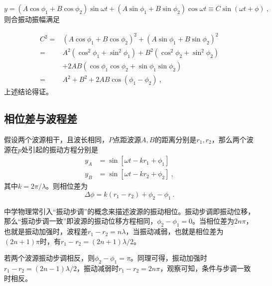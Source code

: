 \begin{equation}
y=\left(A \cos \phi_1+B \cos \phi_2\right) \sin \omega t+\left(A \sin \phi_1+B \sin \phi_2\right) \cos \omega t\equiv C\sin (\omega t+\phi)~,
\end{equation}
则合振动振幅满足

\begin{equation}
\begin{aligned}
C^2
= & \left(A \cos \phi_1+B \cos \phi_2\right)^2+\left(A \sin \phi_1+B \sin \phi_2\right)^2 \\
= & A^2\left(\cos ^2 \phi_1+\sin ^2 \phi_1\right)+B^2\left(\cos ^2 \phi_2+\sin ^2 \phi_2\right) \\
& +2 A B\left(\cos \phi_1 \cos \phi_2+\sin \phi_1 \sin \phi_2\right) \\
= & A^2+B^2+2 A B \cos \left(\phi_1-\phi_2\right)~,
\end{aligned}
\end{equation}
上述结论得证。
\subsection{相位差与波程差}
假设两个波源相干，且波长相同，$P$点距波源$A,B$的距离分别是$r_1,r_2$，那么两个波源在$p$处引起的振动方程分别是
\begin{equation}
\begin{aligned}
y_A&=\sin[\omega t-kr_1+\phi_1]\\
y_B&=\sin[\omega t-kr_2+\phi_2]~,
\end{aligned}
\end{equation}
其中$k=2\pi/\lambda$。则相位差为
\begin{equation}
\Delta\phi=k(r_1-r_2)+\phi_2-\phi_1~.
\end{equation}

中学物理常引入“振动步调”的概念来描述波源的振动相位。振动步调即振动位移，那么“振动步调一致”即波源的振动位移方程相同，$\phi_2-\phi_1=0$。当相位差为$2n\pi$，也就是振动加强时，波程差$r_1-r_2=n\lambda$，当振动减弱，也就是相位差为$(2n+1)\pi$时，有$r_1-r_2=(2n+1)\lambda/2$。

若两个波源振动步调相反，则$\phi_2-\phi_1=\pi$。同理可得，振动加强时$r_1-r_2=(2n-1)\lambda/2$，振动减弱时$r_1-r_2=2n\pi$，观察可知，条件与步调一致时相反。